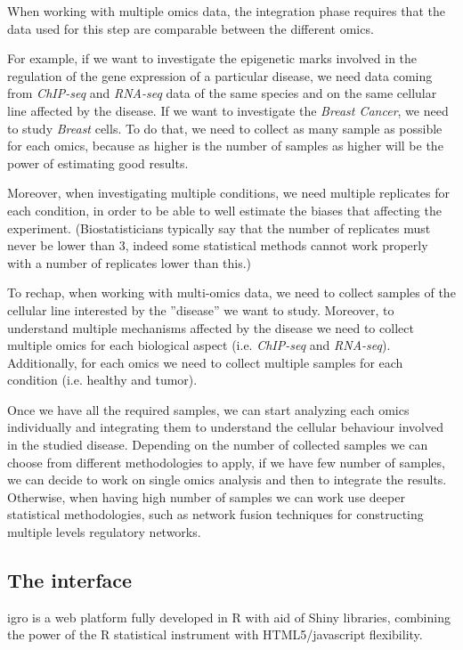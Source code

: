 When working with multiple omics data, the integration phase requires that the data used for this step are comparable between the different omics.

For example, if we want to investigate the epigenetic marks involved in the regulation of the gene expression of a particular disease, we need data coming from \textit{ChIP-seq} and \textit{RNA-seq} data of the same species and on the same cellular line affected by the disease.
If we want to investigate the \textit{Breast Cancer}, we need to study \textit{Breast} cells.
To do that, we need to collect as many sample as possible for each omics, because as higher is the number of samples as higher will be the power of estimating good results.

Moreover, when investigating multiple conditions, we need multiple replicates for each condition, in order to be able to well estimate the biases that affecting the experiment.
(Biostatisticians typically say that the number of replicates must never be lower than 3, indeed some statistical methods cannot work properly with a number of replicates lower than this.)

To rechap, when working with multi-omics data, we need to collect samples of the cellular line interested by the ''disease'' we want to study.
Moreover, to understand multiple mechanisms affected by the disease we need to collect multiple omics for each biological aspect (i.e. \textit{ChIP-seq} and \textit{RNA-seq}).
Additionally, for each omics we need to collect multiple samples for each condition (i.e. healthy and tumor).

Once we have all the required samples, we can start analyzing each omics individually and integrating them to understand the cellular behaviour involved in the studied disease.
Depending on the number of collected samples we can choose from different methodologies to apply, if we have few number of samples, we can decide to work on single omics analysis and then to integrate the results.
Otherwise, when having high number of samples we can work use deeper statistical methodologies, such as network fusion techniques for constructing multiple levels regulatory networks.


\subsection{The interface}
\gls{igro} is a web platform fully developed in R with aid of Shiny libraries, combining the power of the R statistical instrument with HTML5/javascript flexibility.

